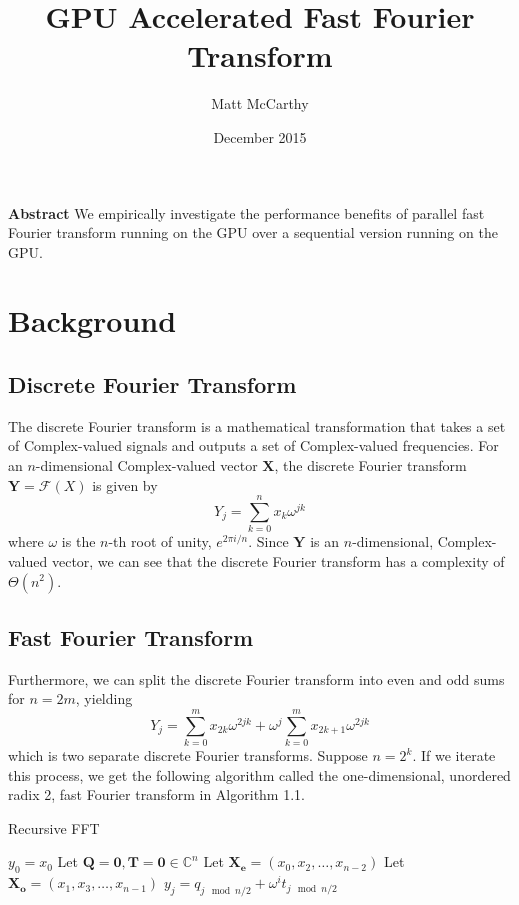 \documentclass[notitlepage, twocolumn]{article}
\title{\bf
GPU Accelerated Fast Fourier Transform
}
\date{December 2015}
\author{
Matt McCarthy
}
\affil{Christopher Newport University\\
\textbf{CPSC 621 Parallel Processing}\\
\texttt{\href{mailto:matthew.mccarthy.12@cnu.edu}{matthew.mccarthy.12@cnu.edu}}
}
\def\CC{\mathbb{C}}	%
\newcommand{\set}[1]{\lbrace #1 \rbrace}
\begin{document}
\nocite{*}
\maketitle

\noindent\textbf{Abstract}
We empirically investigate the performance benefits of parallel fast Fourier transform running on the GPU over a sequential version running on the GPU.

\section{Background}

\subsection{Discrete Fourier Transform}

The discrete Fourier transform is a mathematical transformation that takes a set of Complex-valued signals and outputs a set of Complex-valued frequencies.
For an $n$-dimensional Complex-valued vector $\mathbf{X}$, the discrete Fourier transform $\mathbf{Y}=\mathcal{F}(X)$ is given by
\[
	Y_j = \sum_{k=0}^n x_k \omega^{jk}
\]
where $\omega$ is the $n$-th root of unity, $e^{2\pi i/n}$.
Since $\mathbf{Y}$ is an $n$-dimensional, Complex-valued vector, we can see that the discrete Fourier transform has a complexity of $\Theta(n^2)$.

\subsection{Fast Fourier Transform}

Furthermore, we can split the discrete Fourier transform into even and odd sums for $n=2m$, yielding
\[
	Y_j = \sum_{k=0}^m x_{2k}\omega^{2jk} + \omega^j\sum_{k=0}^m x_{2k+1}\omega^{2jk}
\]
which is two separate discrete Fourier transforms.
Suppose $n=2^k$.
If we iterate this process, we get the following algorithm called the one-dimensional, unordered radix 2, fast Fourier transform in Algorithm 1.1.
\begin{algorithm}
	\caption{Recursive FFT}
	\begin{algorithmic}[1]
				\State $y_0=x_0$
			\Else
				\State Let $\mathbf{Q}=\mathbf{0},\mathbf{T}=\mathbf{0}\in\CC^n$
				\State Let $\mathbf{X_e}=(x_0, x_2,\ldots,x_{n-2})$
				\State Let $\mathbf{X_o}=(x_1, x_3,\ldots,x_{n-1})$
				\State {}
				\State {}
				\ForAll{$j\in\set{0,1,\ldots,n-1}$}
					\State $y_j=q_{j\mod{n/2}}+\omega^i t_{j\mod{n/2}}$
				\EndFor
			\EndIf
		\EndFunction
	\end{algorithmic}
\end{algorithm}
\end{document}
